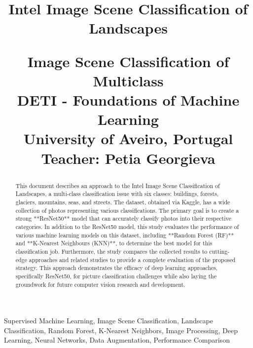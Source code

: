 \documentclass[conference]{IEEEtran}
\begin{document}
\title{Intel Image Scene Classification of Landscapes\\
{\footnotesize \textsuperscript{}

Image Scene Classification of Multiclass \\ 

DETI - Foundations of Machine Learning \\

University of Aveiro, Portugal \\ 

Teacher: Petia Georgieva \\

}
}

\author{
\and
{}
}

\maketitle

\begin{abstract}
 This document describes an approach to the Intel Image Scene Classification of Landscapes, a multi-class classification issue with six classes: buildings, forests, glaciers, mountains, seas, and streets. The dataset, obtained via Kaggle, has a wide collection of photos representing various classifications. The primary goal is to create a strong **ResNet50** model that can accurately classify photos into their respective categories. In addition to the ResNet50 model, this study evaluates the performance of various machine learning models on this dataset, including **Random Forest (RF)** and **K-Nearest Neighbours (KNN)**, to determine the best model for this classification job. Furthermore, the study compares the collected results to cutting-edge approaches and related studies to provide a complete evaluation of the proposed strategy. This approach demonstrates the efficacy of deep learning approaches, specifically ResNet50, for picture classification challenges while also laying the groundwork for future computer vision research and development.
\end{abstract}

\vspace{1em}

\begin{IEEEkeywords}
Supervised Machine Learning,
Image Scene Classification,
Landscape Classification,
Random Forest,
K-Nearest Neighbors,
Image Processing,
Deep Learning,
Neural Networks,
Data Augmentation,
Performance Comparison
\end{IEEEkeywords}
\end{document}
